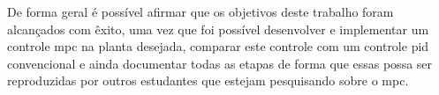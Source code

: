 De forma geral é possível afirmar que os objetivos deste trabalho foram alcançados com êxito, uma vez que foi
possível desenvolver e implementar um controle \acrshort{mpc} na planta desejada, comparar este controle 
com um controle \acrshort{pid} convencional e ainda documentar todas as etapas de forma que essas possa ser reproduzidas
por outros estudantes que estejam pesquisando sobre o \acrlong{mpc}.

